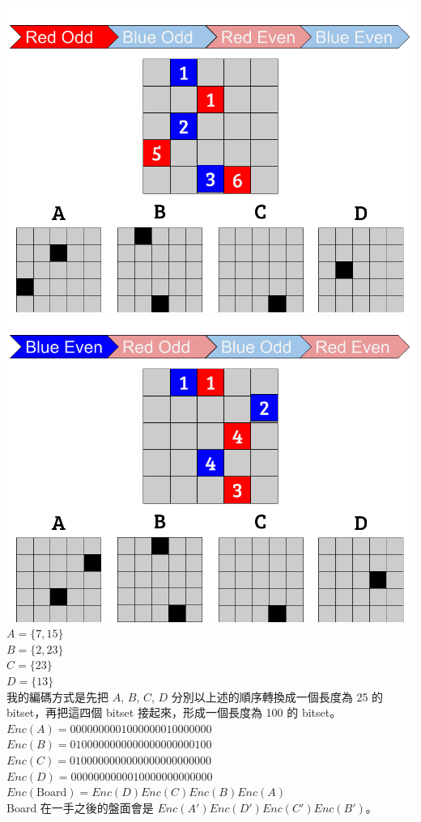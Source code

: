 \documentclass[12pt,a4paper]{article}
\begin{document}
        \includegraphics[scale=0.25]{img/Board1}\includegraphics[scale=0.25]{img/Board2}\\
        \(A = \{7, 15\}\)\\
        \(B = \{2, 23\}\)\\
        \(C = \{23\}\)\\
        \(D = \{13\}\)\\
        我的編碼方式是先把 \(A\), \(B\), \(C\), \(D\) 分別以上述的順序轉換成一個長度為 25 的 bitset，再把這四個 bitset 接起來，形成一個長度為 100 的 bitset。\\
        \(Enc(A) = 0000000001000000010000000\)\\
        \(Enc(B) = 0100000000000000000000100\)\\
        \(Enc(C) = 0100000000000000000000000\)\\
        \(Enc(D) = 0000000000010000000000000\)\\
        \(Enc(\text{Board})=Enc(D)Enc(C)Enc(B)Enc(A)\)\\
        Board 在一手之後的盤面會是 \(Enc(A')Enc(D')Enc(C')Enc(B')\)。
\end{document}

